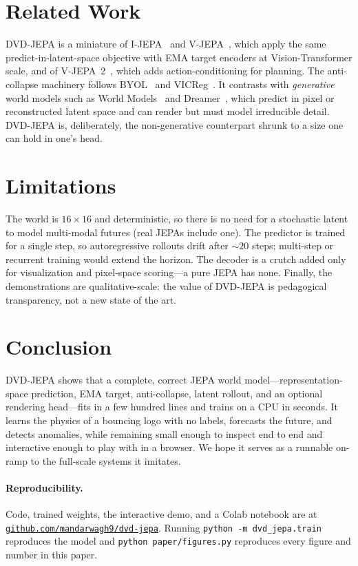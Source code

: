 \documentclass[11pt]{article}
\begin{document}
\section{Related Work}
DVD-JEPA is a miniature of I-JEPA~\cite{assran2023} and V-JEPA~\cite{bardes2024}, which apply the same
predict-in-latent-space objective with EMA target encoders at Vision-Transformer scale, and of
V-JEPA~2~\cite{vjepa2}, which adds action-conditioning for planning. The anti-collapse machinery follows
BYOL~\cite{grill2020} and VICReg~\cite{bardes2022}. It contrasts with \emph{generative} world models
such as World Models~\cite{ha2018} and Dreamer~\cite{hafner2020}, which predict in pixel or reconstructed
latent space and can render but must model irreducible detail. DVD-JEPA is, deliberately, the non-generative
counterpart shrunk to a size one can hold in one's head.

\section{Limitations}
The world is $16\times16$ and deterministic, so there is no need for a stochastic latent to model
multi-modal futures (real JEPAs include one). The predictor is trained for a single step, so autoregressive
rollouts drift after ${\sim}20$ steps; multi-step or recurrent training would extend the horizon. The
decoder is a crutch added only for visualization and pixel-space scoring---a pure JEPA has none. Finally,
the demonstrations are qualitative-scale: the value of DVD-JEPA is pedagogical transparency, not a new
state of the art.

\section{Conclusion}
DVD-JEPA shows that a complete, correct JEPA world model---representation-space prediction, EMA target,
anti-collapse, latent rollout, and an optional rendering head---fits in a few hundred lines and trains on
a CPU in seconds. It learns the physics of a bouncing logo with no labels, forecasts the future, and
detects anomalies, while remaining small enough to inspect end to end and interactive enough to play with
in a browser. We hope it serves as a runnable on-ramp to the full-scale systems it imitates.

\paragraph{Reproducibility.} Code, trained weights, the interactive demo, and a Colab notebook are at
\href{https://github.com/mandarwagh9/dvd-jepa}{\texttt{github.com/mandarwagh9/dvd-jepa}}. Running
\texttt{python -m dvd\_jepa.train} reproduces the model and \texttt{python paper/figures.py} reproduces
every figure and number in this paper.
\end{document}
